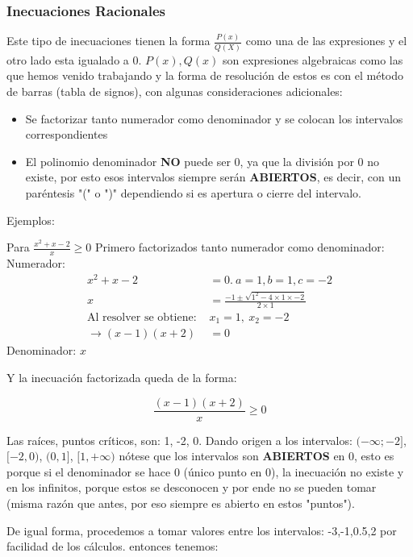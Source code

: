 \documentclass[12pt]{article}
\begin{document}
\subsubsection*{Inecuaciones Racionales}
    Este tipo de inecuaciones tienen la forma $ \displaystyle \frac{P(x)}{Q(X)} $
    como una de las expresiones y el otro lado esta igualado a 0.
    $ P(x), Q(x) $ son expresiones algebraicas como las que hemos venido trabajando
    y la forma de resolución de estos es con el método de barras (tabla de signos),
    con algunas consideraciones adicionales:

    \begin{itemize}
        \item Se factorizar tanto numerador como denominador y se colocan los
            intervalos correspondientes
        \item El polinomio denominador \textbf{NO} puede ser 0, ya que la división
            por 0 no existe, por esto esos intervalos siempre serán \textbf{ABIERTOS},
            es decir, con un paréntesis "(" o ")" dependiendo si  es apertura o
            cierre del intervalo.
    \end{itemize}

    Ejemplos:

    Para $ \frac{x^2+x-2}{x} \geq 0 $
    Primero factorizados tanto numerador como denominador:
    Numerador:
    \begin{align*}
        x^2+x-2 &=0.\ a=1,b=1,c=-2 		\\
        x &= \frac{-1\pm \sqrt{1^2-4\times1\times-2}}{2\times1}\\
        \text{Al resolver se obtiene: }& x_1=1,\ x_2=-2\\
        \rightarrow (x-1)(x+2)&=0
    \end{align*}
    Denominador: $x$

    Y la inecuación factorizada queda de la forma:

    $$ \frac{(x-1)(x+2)}{x} \geq 0  $$

    Las raíces, puntos críticos, son: 1, -2, 0. Dando origen a los intervalos:
    $ (-\infty;-2]$, $[-2,0)$, $ (0,1] $, $[1,+\infty)$
    nótese que los intervalos son \textbf{ABIERTOS} en 0, esto es porque si el
    denominador se hace 0 (único punto en 0), la inecuación no existe y en los
    infinitos, porque estos se desconocen y por ende no se pueden tomar (misma
    razón que antes, por eso siempre es abierto en estos "puntos").

    De igual forma, procedemos a tomar valores entre los intervalos:
    -3,-1,0.5,2 por facilidad de los cálculos. entonces tenemos:
\end{document}
